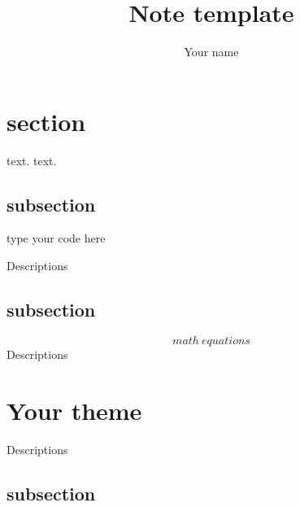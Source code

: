 \documentclass[12pt]{article}
\title{Note template}
\author{Your name}
\begin{document}
\maketitle
\pagestyle{fancy}
\tableofcontents
\newpage
{}

\section*{section}
text.
\newline
text.
\subsection{subsection}
\begin{python}
    type your code here
\end{python}
    Descriptions
\subsection{subsection}
\[
    math\ equations
\]
Descriptions
\section*{Your theme}
Descriptions
\subsection{subsection}
\end{document}
